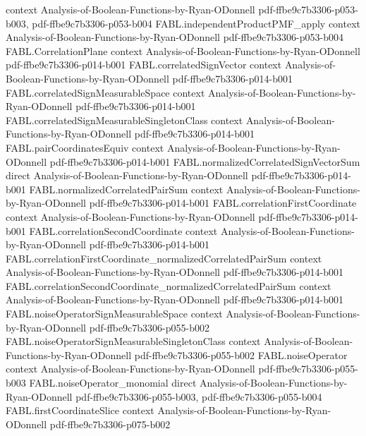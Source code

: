 \begin{theorem}
  {context}
  {Analysis-of-Boolean-Functions-by-Ryan-ODonnell}
  {pdf-ffbe9c7b3306-p053-b003,
    pdf-ffbe9c7b3306-p053-b004}
\proofstep
  {FABL.independentProductPMF_apply}
  {context}
  {Analysis-of-Boolean-Functions-by-Ryan-ODonnell}
  {pdf-ffbe9c7b3306-p053-b004}
\proofstep
  {FABL.CorrelationPlane}
  {context}
  {Analysis-of-Boolean-Functions-by-Ryan-ODonnell}
  {pdf-ffbe9c7b3306-p014-b001}
\proofstep
  {FABL.correlatedSignVector}
  {context}
  {Analysis-of-Boolean-Functions-by-Ryan-ODonnell}
  {pdf-ffbe9c7b3306-p014-b001}
\proofstep
  {FABL.correlatedSignMeasurableSpace}
  {context}
  {Analysis-of-Boolean-Functions-by-Ryan-ODonnell}
  {pdf-ffbe9c7b3306-p014-b001}
\proofstep
  {FABL.correlatedSignMeasurableSingletonClass}
  {context}
  {Analysis-of-Boolean-Functions-by-Ryan-ODonnell}
  {pdf-ffbe9c7b3306-p014-b001}
\proofstep
  {FABL.pairCoordinatesEquiv}
  {context}
  {Analysis-of-Boolean-Functions-by-Ryan-ODonnell}
  {pdf-ffbe9c7b3306-p014-b001}
\proofstep
  {FABL.normalizedCorrelatedSignVectorSum}
  {direct}
  {Analysis-of-Boolean-Functions-by-Ryan-ODonnell}
  {pdf-ffbe9c7b3306-p014-b001}
\proofstep
  {FABL.normalizedCorrelatedPairSum}
  {context}
  {Analysis-of-Boolean-Functions-by-Ryan-ODonnell}
  {pdf-ffbe9c7b3306-p014-b001}
\proofstep
  {FABL.correlationFirstCoordinate}
  {context}
  {Analysis-of-Boolean-Functions-by-Ryan-ODonnell}
  {pdf-ffbe9c7b3306-p014-b001}
\proofstep
  {FABL.correlationSecondCoordinate}
  {context}
  {Analysis-of-Boolean-Functions-by-Ryan-ODonnell}
  {pdf-ffbe9c7b3306-p014-b001}
\proofstep
  {FABL.correlationFirstCoordinate_normalizedCorrelatedPairSum}
  {context}
  {Analysis-of-Boolean-Functions-by-Ryan-ODonnell}
  {pdf-ffbe9c7b3306-p014-b001}
\proofstep
  {FABL.correlationSecondCoordinate_normalizedCorrelatedPairSum}
  {context}
  {Analysis-of-Boolean-Functions-by-Ryan-ODonnell}
  {pdf-ffbe9c7b3306-p014-b001}
\proofstep
  {FABL.noiseOperatorSignMeasurableSpace}
  {context}
  {Analysis-of-Boolean-Functions-by-Ryan-ODonnell}
  {pdf-ffbe9c7b3306-p055-b002}
\proofstep
  {FABL.noiseOperatorSignMeasurableSingletonClass}
  {context}
  {Analysis-of-Boolean-Functions-by-Ryan-ODonnell}
  {pdf-ffbe9c7b3306-p055-b002}
\proofstep
  {FABL.noiseOperator}
  {context}
  {Analysis-of-Boolean-Functions-by-Ryan-ODonnell}
  {pdf-ffbe9c7b3306-p055-b003}
\proofstep
  {FABL.noiseOperator_monomial}
  {direct}
  {Analysis-of-Boolean-Functions-by-Ryan-ODonnell}
  {pdf-ffbe9c7b3306-p055-b003,
    pdf-ffbe9c7b3306-p055-b004}
\proofstep
  {FABL.firstCoordinateSlice}
  {context}
  {Analysis-of-Boolean-Functions-by-Ryan-ODonnell}
  {pdf-ffbe9c7b3306-p075-b002}

\end{theorem}
